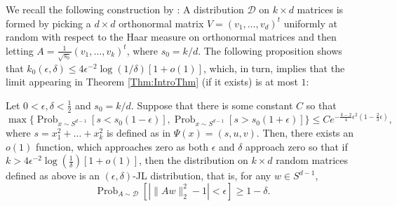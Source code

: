 \documentclass[twoside,11pt]{article}
\newcommand{\D}{\mathcal{D}}
\newcommand{\pPP}[2]{\operatorname{Prob}_{#2} \left[ #1 \right] }
\begin{document}
We recall the following construction  by  \cite{DasguptaGupta}:   A distribution $\D$ on $k \times d$ matrices is formed by picking a $d\times d$ orthonormal  matrix 
$V = (v_1, \ldots, v_d)^t$ uniformly at random with respect to the Haar measure on orthonormal matrices 
and then letting $A = \frac{1}{\sqrt{s_0}}(v_1, \ldots, v_k)^t$, where $s_0= k/d$.  The following proposition shows that $k_0(\epsilon, \delta)   \leq  4\epsilon^{-2} \log(1/\delta) \left[ 1+ o(1)\right]$, which, in turn, implies that
the limit appearing in Theorem \ref{Thm:IntroThm} (if it exists) is at most $1$:
\begin{proposition} \label{prop: exists}
Let $0<\epsilon,\delta<\frac{1}{2}$ and $s_0=k/d$.  Suppose that there is some constant $C$ so that
$$
\max\{\pPP{ s < s_0(1-\epsilon)}{x\sim S^{d-1}},\pPP{ s> s_0(1+\epsilon)}{x\sim S^{d-1}} \}\leq Ce^{-\frac{k-2}{4}\epsilon^2\left(1-\frac{2}{3}\epsilon\right)},
$$
where $s=x_1^2+\dots+x_k^2$ is defined as in $\Psi(x)=(s,u,v)$.
Then, there exists an $o(1)$ function, which approaches zero as both $\epsilon$ and $\delta$ approach zero so that if $k> 4\epsilon^{-2} \log \left(\frac{1}{\delta} \right) \left[1+o(1)\right]$, then the distribution on $k\times d$ random matrices defined as above is 
an $(\epsilon, \delta)$-JL distribution, 
that is,   for any $w \in S^{d-1}$, 
\[\pPP{\left|\|Aw\|^2_2 -1\right| < \epsilon}{A \sim \D}  \geq 1- \delta.\]
\end{proposition}
\end{document}
